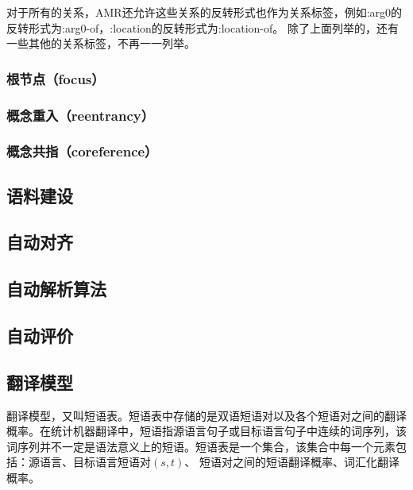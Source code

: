 \documentclass[master, winfont]{njuthesis}
\begin{document}
对于所有的关系，AMR还允许这些关系的反转形式也作为关系标签，例如:arg0的反转形式为:arg0-of，:location的反转形式为:location-of。
除了上面列举的，还有一些其他的关系标签，不再一一列举。

\subsubsection{根节点（focus）}

\subsubsection{概念重入（reentrancy）}


\subsubsection{概念共指（coreference）}

\subsection{语料建设}

\subsection{自动对齐}

\subsection{自动解析算法}

\subsection{自动评价}

\subsection{翻译模型}\label{section:tmextract}
翻译模型，又叫短语表。短语表中存储的是双语短语对以及各个短语对之间的翻译概率\cite{marcu2002phrase}。在统计机器翻译中，短语指源语言句子或目标语言句子中连续的词序列，该词序列并不一定是语法意义上的短语。短语表是一个集合，该集合中每一个元素包括：源语言、目标语言短语对$(s,t)$、 短语对之间的短语翻译概率、词汇化翻译概率。
\end{document}
